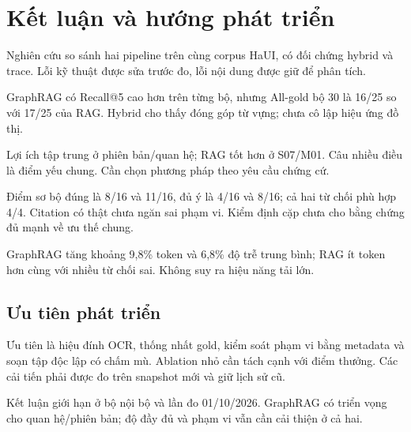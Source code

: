 \section{Kết luận và hướng phát triển}
Nghiên cứu so sánh hai pipeline trên cùng corpus HaUI, có đối chứng hybrid và trace. Lỗi kỹ thuật được sửa trước đo, lỗi nội dung được giữ để phân tích.

GraphRAG có Recall@5 cao hơn trên từng bộ, nhưng All-gold bộ 30 là 16/25 so với 17/25 của RAG. Hybrid cho thấy đóng góp từ vựng; chưa cô lập hiệu ứng đồ thị.

Lợi ích tập trung ở phiên bản/quan hệ; RAG tốt hơn ở S07/M01. Câu nhiều điều là điểm yếu chung. Cần chọn phương pháp theo yêu cầu chứng cứ.

Điểm sơ bộ đúng là 8/16 và 11/16, đủ ý là 4/16 và 8/16; cả hai từ chối phù hợp 4/4. Citation có thật chưa ngăn sai phạm vi. Kiểm định cặp chưa cho bằng chứng đủ mạnh về ưu thế chung.

GraphRAG tăng khoảng 9,8\% token và 6,8\% độ trễ trung bình; RAG ít token hơn cùng với nhiều từ chối sai. Không suy ra hiệu năng tải lớn.

\subsection{Ưu tiên phát triển}
Ưu tiên là hiệu đính OCR, thống nhất gold, kiểm soát phạm vi bằng metadata và soạn tập độc lập có chấm mù. Ablation nhỏ cần tách cạnh với điểm thưởng. Các cải tiến phải được đo trên snapshot mới và giữ lịch sử cũ.

Kết luận giới hạn ở bộ nội bộ và lần đo 01/10/2026. GraphRAG có triển vọng cho quan hệ/phiên bản; độ đầy đủ và phạm vi vẫn cần cải thiện ở cả hai.

